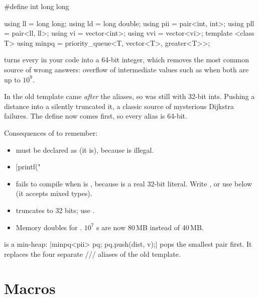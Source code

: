 \begin{code}
#define int long long

using ll = long long;
using ld = long double;
using pii = pair<int, int>;
using pll = pair<ll, ll>;
using vi = vector<int>;
using vvi = vector<vi>;
template <class T> using minpq = priority_queue<T, vector<T>, greater<T>>;
\end{code}

 turns every  in your code into a 64-bit integer, which removes the most common
source of wrong answers: overflow of intermediate values such as  when both are up to $10^9$.

\begin{fact}
In the old template  came \emph{after} the aliases, so  was still
 with 32-bit ints. Pushing a  distance into a  silently truncated it,
a classic source of mysterious Dijkstra failures. The define now comes first, so every alias is 64-bit.
\end{fact}

Consequences of  to remember:
\begin{itemize}
  \item {} must be declared as  (it is), because  is illegal.
  \item \cc|printf("%
  \item {} fails to compile when  is , because  is a real 32-bit 
        literal. Write ,  or use  below (it accepts mixed types).
  \item {} truncates to 32 bits; use .
  \item Memory doubles for . $10^7$ s are now 80\,MB instead of 40\,MB.
\end{itemize}

 is a min-heap: \cc|minpq<pii> pq; pq.push({dist, v});| pops the smallest pair first. It replaces the
four separate /// aliases of the old template.

\section{Macros}

